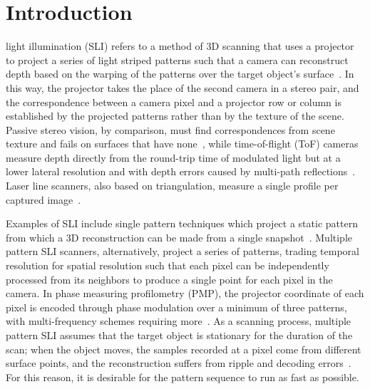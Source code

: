 \documentclass[10pt,journal,compsoc]{IEEEtran}
\begin{document}
\maketitle
\IEEEdisplaynontitleabstractindextext
\IEEEpeerreviewmaketitle

\section{Introduction}
\label{sec:intro}

 light illumination (SLI) refers to a method of 3D scanning that
uses a projector to project a series of light striped patterns such that a camera can
reconstruct depth based on the warping of the patterns over the target object's
surface~\cite{salvi2004pattern,geng2011tutorial,zuo2018phase}. In this way, the projector takes
the place of the second camera in a stereo pair, and the correspondence between a camera pixel
and a projector row or column is established by the projected patterns rather than by the
texture of the scene. Passive stereo vision, by comparison, must find correspondences from
scene texture and fails on surfaces that have none~\cite{scharstein2002taxonomy}, while
time-of-flight (ToF) cameras measure depth directly from the round-trip time of modulated light
but at a lower lateral resolution and with depth errors caused by multi-path
reflections~\cite{hansard2012tof}. Laser line scanners, also based on triangulation, measure a
single profile per captured image~\cite{blais2004review}.

Examples of SLI include single pattern techniques which project a static pattern from which a 3D
reconstruction can be made from a single snapshot~\cite{takeda1983fourier,geng2011tutorial}.
Multiple pattern SLI scanners, alternatively, project a series of patterns, trading temporal
resolution for spatial resolution such that each pixel can be independently processed from its
neighbors to produce a single point for each pixel in the camera. In phase measuring
profilometry (PMP), the projector coordinate of each pixel is encoded through phase modulation
over a minimum of three patterns, with multi-frequency schemes requiring
more~\cite{liu2010dualfreq,zuo2018phase}. As a scanning process, multiple pattern SLI assumes
that the target object is stationary for the duration of the scan; when the object moves, the
samples recorded at a pixel come from different surface points, and the reconstruction suffers
from ripple and decoding errors~\cite{weise2007fast,zhang2018review}. For this reason, it is
desirable for the pattern sequence to run as fast as possible.
\end{document}
